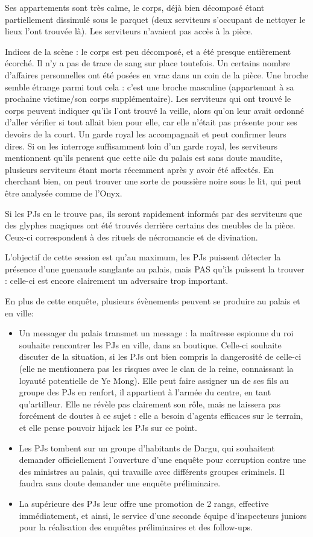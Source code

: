 \documentclass[10pt,a4paper]{book}
\begin{document}
Ses appartements sont très calme, le corps, déjà bien décomposé étant partiellement dissimulé sous le parquet (deux serviteurs s'occupant de nettoyer le lieux l'ont trouvée là). Les serviteurs n'avaient pas accès à la pièce.

Indices de la scène : le corps est peu décomposé, et a été presque entièrement écorché. Il n'y a pas de trace de sang sur place toutefois. Un certains nombre d'affaires personnelles ont été posées en vrac dans un coin de la pièce. Une broche semble étrange parmi tout cela : c'est une broche masculine (appartenant à sa prochaine victime/son corps supplémentaire). Les serviteurs qui ont trouvé le corps peuvent indiquer qu'ils l'ont trouvé la veille, alors qu'on leur avait ordonné d'aller vérifier si tout allait bien pour elle, car elle n'était pas présente pour ses devoirs de la court. Un garde royal les accompagnait et peut confirmer leurs dires. Si on les interroge suffisamment loin d'un garde royal, les serviteurs mentionnent qu'ils pensent que cette aile du palais est sans doute maudite, plusieurs serviteurs étant morts récemment après y avoir été affectés. En cherchant bien, on peut trouver une sorte de poussière noire sous le lit, qui peut être analysée comme de l'Onyx.

Si les PJs en le trouve pas, ils seront rapidement informés par des serviteurs que des glyphes magiques ont été trouvés derrière certains des meubles de la pièce. Ceux-ci correspondent à des rituels de nécromancie et de divination. 

L'objectif de cette session est qu'au maximum, les PJs puissent détecter la présence d'une guenaude sanglante au palais, mais PAS qu'ils puissent la trouver : celle-ci est encore clairement un adversaire trop important.

En plus de cette enquête, plusieurs évènements peuvent se produire au palais et en ville:
\begin{itemize}
\item Un messager du palais transmet un message : la maîtresse espionne du roi souhaite rencontrer les PJs en ville, dans sa boutique. Celle-ci souhaite discuter de la situation, si les PJs ont bien compris la dangerosité de celle-ci (elle ne mentionnera pas les risques avec le clan de la reine, connaissant la loyauté potentielle de Ye Mong). Elle peut faire assigner un de ses fils au groupe des PJs en renfort, il appartient à l'armée du centre, en tant qu'artilleur. Elle ne révèle pas clairement son rôle, mais ne laissera pas forcément de doutes à ce sujet : elle a besoin d'agents efficaces sur le terrain, et elle pense pouvoir hijack les PJs sur ce point.
\item Les PJs tombent sur un groupe d'habitants de Dargu, qui souhaitent demander officiellement l'ouverture d'une enquête pour corruption contre une des ministres au palais, qui travaille avec différents groupes criminels. Il faudra sans doute demander une enquête préliminaire.
\item La supérieure des PJs leur offre une promotion de 2 rangs, effective immédiatement, et ainsi, le service d'une seconde équipe d'inspecteurs juniors pour la réalisation des enquêtes préliminaires et des follow-ups.
\end{itemize}
\end{document}

